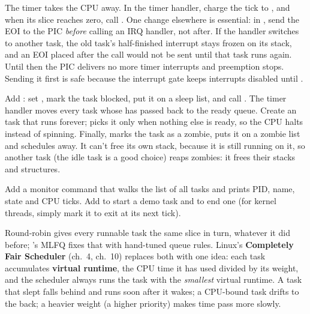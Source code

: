 \documentclass[11pt,a4paper]{article}
\begin{document}
The timer takes the CPU away. In the timer handler, charge the tick to , and when its slice
reaches zero, call . One change elsewhere is essential: in , send the EOI to the PIC
\emph{before} calling an IRQ handler, not after. If the handler switches to another task, the old task's half-finished
interrupt stays frozen on its stack, and an EOI placed after the call would not be sent until that task runs again.
Until then the PIC delivers no more timer interrupts and preemption stops. Sending it first is safe because the
interrupt gate keeps interrupts disabled until .

Add : set , mark the task blocked, put it on a sleep list, and call .
The timer handler moves every task whose  has passed back to the ready queue. Create an 
task that runs  forever;  picks it only when nothing else is ready, so the CPU halts
instead of spinning. Finally,  marks the task as a zombie, puts it on a zombie list and schedules
away. It can't free its own stack, because it is still running on it, so another task (the idle task is a good
choice) reaps zombies: it frees their stacks and structures.

Add a  monitor command that walks the list of all tasks and prints PID, name, state and CPU ticks. Add
 to start a demo task and  to end one (for kernel threads, simply mark it to exit
at its next tick).

Round-robin gives every runnable task the same slice in turn, whatever it did before; \OSTEP's MLFQ fixes that with
hand-tuned queue rules. Linux's \textbf{Completely Fair Scheduler} (\LKD ch.~4, \LKP ch.~10) replaces both with one
idea: each task accumulates \textbf{virtual runtime}, the CPU time it has used divided by its weight, and the
scheduler always runs the task with the \emph{smallest} virtual runtime. A task that slept falls behind and runs soon
after it wakes; a CPU-bound task drifts to the back; a heavier weight (a higher priority) makes time pass more slowly.
\end{document}
